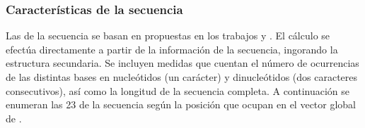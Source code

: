 %
%
\subsubsection{Características de la secuencia}
%
Las  de la secuencia se basan en  propuestas en
los trabajos  \cite{ng} y  \cite{batuwita}.
El cálculo se efectúa directamente a partir de la información de la
secuencia, ingorando la estructura secundaria.
Se incluyen medidas que cuentan el número de ocurrencias de las
distintas bases en nucleótidos (un carácter) y dinucleótidos (dos
caracteres consecutivos), así como la longitud de la secuencia
completa.
A continuación se enumeran las 23  de la secuencia según
la posición que ocupan en el vector global de .
